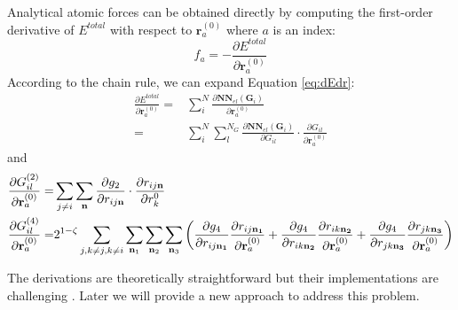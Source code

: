 \documentclass[preprint]{revtex4-2}
\begin{document}
Analytical atomic forces can be obtained directly by computing the first-order 
derivative of $E^{total}$ with respect to $\mathbf{r}_{a}^{(0)}$ where $a$ is an 
index:
\begin{equation}
\label{eq:dEdr}
f_a = -\frac{\partial E^{total}}{\partial \mathbf{r}_a^{(0)}}
\end{equation}
According to the chain rule, we can expand Equation \ref{eq:dEdr}:
\begin{align}
\frac{\partial E^{total}}{\partial \mathbf{r}_a^{(0)}} = & \sum_{i}^{N}{
    \frac{
        \partial\mathbf{NN}_{el}(\mathbf{G}_i)}{
        \partial \mathbf{r}_a^{(0)}}} \nonumber \\
= & \sum_{i}^{N}{\sum_{l}^{N_G}{
    \frac{\partial \mathbf{NN}_{el}(\mathbf{G}_i)}{\partial G_{il}}
    \cdot
    \frac{\partial G_{il}}{\partial \mathbf{r}_{a}^{(0)}}
}}
\end{align}
and 
\begin{align}
\frac{\partial G_{il}^{(2)}}{\partial \mathbf{r}_{a}^{(0)}} = & \sum_{j \neq i}{
    \sum_{\mathbf{n}}{
        \frac{\partial g_2}{\partial r_{ij\mathbf{n}}}
        \cdot
        \frac{\partial r_{ij\mathbf{n}}}{\partial r_k^{0}}
    }
} \\
\frac{\partial G_{il}^{(4)}}{\partial \mathbf{r}_{a}^{(0)}} = &
2^{1 - \zeta}\sum_{j, k \neq j, k \neq i}{
    \sum_{\mathbf{n}_1}{\sum_{\mathbf{n}_2}{\sum_{\mathbf{n}_3}{
        \left(
            \frac{\partial g_4}{\partial r_{ij\mathbf{n_1}}}
            \frac{\partial r_{ij\mathbf{n_1}}}{\partial \mathbf{r}_{a}^{(0)}} + 
            \frac{\partial g_4}{\partial r_{ik\mathbf{n_2}}}
            \frac{\partial r_{ik\mathbf{n_2}}}{\partial \mathbf{r}_{a}^{(0)}} + 
            \frac{\partial g_4}{\partial r_{jk\mathbf{n_3}}}
            \frac{\partial r_{jk\mathbf{n_3}}}{\partial \mathbf{r}_{a}^{(0)}}
        \right)
    }}}
}
\end{align}

The derivations are theoretically straightforward but their implementations are 
challenging \cite{AMP}. Later we will provide a new approach to address this 
problem.
\end{document}
